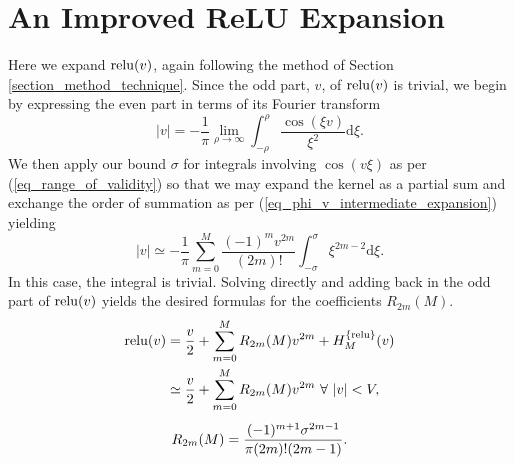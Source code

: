 \section{An Improved ReLU Expansion}
Here we expand $\operatorname{relu}(v)$, again following the method of
Section \ref{section_method_technique}.  Since the odd part, $v$,
of $\operatorname{relu}(v)$ is trivial, we begin by expressing the
even part in terms of its Fourier transform
\begin{equation}
	|v| = - \frac{1}{\pi} \lim_{\rho \to \infty} 
	\int_{-\rho}^{\rho} \! \frac{\cos(\xi v)}{\xi^2} \mathrm{d}\xi.
\end{equation}
We then apply our bound $\sigma$ for integrals involving $\cos(v \xi)$
as per (\ref{eq_range_of_validity}) so that we may expand the kernel as a
partial sum and exchange the order of summation as per 
(\ref{eq_phi_v_intermediate_expansion}) yielding
\begin{equation}
	|v| \simeq -\frac{1}{\pi} \sum_{m=0}^{M}
	\frac{(-1)^m v^{2m}}{(2m)!}
	\int_{-\sigma}^{\sigma} \! \xi^{2m-2} \mathrm{d}\xi.
\end{equation}
In this case, the integral is trivial.  Solving directly
and adding back in the odd part of $\operatorname{relu}(v)$ yields the desired
formulas for the coefficients $R_{2m}(M)$.
\begin{gather}
	\begin{split}
		\label{eq_relu_expansion_full}
		\relu(v) &= \frac{v}{2} + \sum_{m=0}^{M} R_{2m}(M) v^{2m} + H_M^{\{\relu\}}(v) \\
		&\simeq \frac{v}{2} +\sum_{m=0}^{M} R_{2m}(M) v^{2m} \ \forall \ |v| < V,
	\end{split}
	\\[1ex]
	\begin{split}
		R_{2m}(M) = \frac{(-1)^{m+1} \sigma^{2m-1}}{\pi (2m)! (2m - 1)}.
		\label{eq_relu_solution}
	\end{split}
\end{gather}

